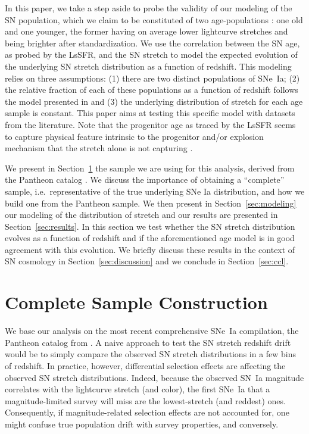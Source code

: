 \documentclass[]{aa}
\begin{document}
In this paper, we take a step aside to probe the validity of our modeling of the
SN population, which we claim to be constituted of two age-populations
\citep{rigault2013,rigault2015,rigault2018}: one old and one younger, the former
having on average lower lightcurve stretches and being brighter after
standardization. We use the correlation between the SN age, as probed by the
LsSFR, and the SN stretch to model the expected evolution of the underlying SN
stretch distribution as a function of redshift. This modeling relies on three
assumptions: (1) there are two distinct populations of SNe~Ia; (2) the relative
fraction of each of these populations as a function of redshift follows the
model presented in \cite{rigault2018} and (3) the underlying distribution of
stretch for each age sample is constant. This paper aims at testing this
specific model with datasets from the literature. Note that the progenitor age
as traced by the LsSFR seems to capture physical feature intrinsic to the
progenitor and/or explosion mechanism that the stretch alone is not capturing
\citep{nordin2018}.

We present in Section~\ref{sec:sample} the sample we are using for this
analysis, derived from the Pantheon catalog \citep{scolnic2018a}. We discuss the
importance of obtaining a ``complete'' sample, i.e.\ representative of the true
underlying SNe Ia distribution, and how we build one from the Pantheon sample.
We then present in Section~\ref{sec:modeling} our modeling of the distribution
of stretch and our results are presented in Section~\ref{sec:results}. In this
section we test whether the SN stretch distribution evolves as a function of
redshift and if the aforementioned age model is in good agreement with this
evolution. We briefly discuss these results in the context of SN cosmology in
Section~\ref{sec:discussion} and we conclude in Section~\ref{sec:ccl}.

\section{Complete Sample Construction}\label{sec:sample}

We base our analysis on the most recent comprehensive SNe~Ia compilation, the
Pantheon catalog from \cite{scolnic2018a}. A naive approach to test the SN
stretch redshift drift would be to simply compare the observed SN stretch
distributions in a few bins of redshift. In practice, however, differential
selection effects are affecting the observed SN stretch distributions. Indeed,
because the observed SN~Ia magnitude correlates with the lightcurve stretch (and
color), the first SNe~Ia that a magnitude-limited survey will miss are the
lowest-stretch (and reddest) ones. Consequently, if magnitude-related selection
effects are not accounted for, one might confuse true population drift with
survey properties, and conversely.
\end{document}
